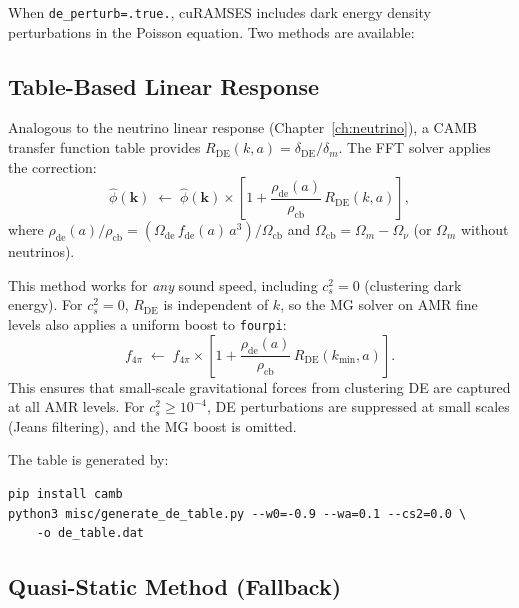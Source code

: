 \documentclass[11pt,fleqn]{book}
\begin{document}
When \texttt{de\_perturb=.true.}, cuRAMSES includes dark energy density
perturbations in the Poisson equation.  Two methods are available:

\subsection{Table-Based Linear Response}

Analogous to the neutrino linear response (Chapter~\ref{ch:neutrino}),
a CAMB transfer function table provides $R_{\mathrm{DE}}(k,a) =
\delta_{\mathrm{DE}} / \delta_m$.  The FFT solver applies the correction:
\begin{equation}\label{eq:de_factor_table}
  \hat\phi(\mathbf{k}) \;\leftarrow\; \hat\phi(\mathbf{k}) \times
  \left[1 + \frac{\rho_{\mathrm{de}}(a)}{\rho_{\mathrm{cb}}}\,
  R_{\mathrm{DE}}(k,a)\right],
\end{equation}
where $\rho_{\mathrm{de}}(a)/\rho_{\mathrm{cb}} = (\Omega_{\mathrm{de}}\,
f_{\mathrm{de}}(a)\,a^3) / \Omega_{\mathrm{cb}}$ and $\Omega_{\mathrm{cb}}
= \Omega_m - \Omega_\nu$ (or $\Omega_m$ without neutrinos).

This method works for \emph{any} sound speed, including $c_s^2 = 0$ (clustering
dark energy).  For $c_s^2 = 0$, $R_{\mathrm{DE}}$ is independent of $k$, so
the MG solver on AMR fine levels also applies a uniform boost to \texttt{fourpi}:
\begin{equation}
  f_{4\pi} \;\leftarrow\; f_{4\pi} \times
  \left[1 + \frac{\rho_{\mathrm{de}}(a)}{\rho_{\mathrm{cb}}}\,
  R_{\mathrm{DE}}(k_{\min},a)\right].
\end{equation}
This ensures that small-scale gravitational forces from clustering DE are
captured at all AMR levels.  For $c_s^2 \geq 10^{-4}$, DE perturbations
are suppressed at small scales (Jeans filtering), and the MG boost is omitted.

The table is generated by:
\begin{codebox}
\begin{lstlisting}[style=fortran,numbers=none]
pip install camb
python3 misc/generate_de_table.py --w0=-0.9 --wa=0.1 --cs2=0.0 \
    -o de_table.dat
\end{lstlisting}
\end{codebox}

\subsection{Quasi-Static Method (Fallback)}
\end{document}
